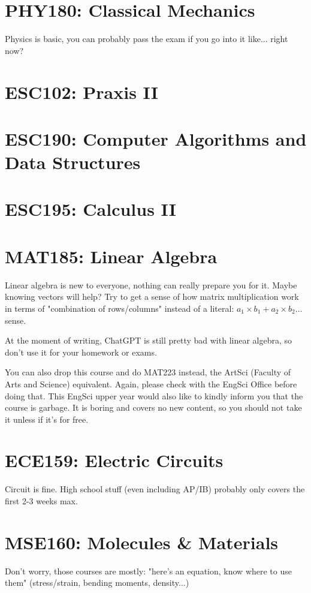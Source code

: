 \section{PHY180: Classical Mechanics}

Physics is basic, you can probably pass the exam if you go into it like... right now?

\section{ESC102: Praxis II}

\section{ESC190: Computer Algorithms and Data Structures}

\section{ESC195: Calculus II}

\section{MAT185: Linear Algebra}

Linear algebra is new to everyone, nothing can really prepare you for it. Maybe knowing vectors will help? Try to get a sense of how matrix multiplication work in terms of "combination of rows/columns" instead of a literal: $a_1\times b_1 + a_2\times b_2\dots$ sense.

At the moment of writing, ChatGPT is still pretty bad with linear algebra, so don't use it for your homework or exams.

You can also drop this course and do MAT223 instead, the ArtSci (Faculty of Arts and Science) equivalent. Again, please check with the EngSci Office before doing that. This EngSci upper year would also like to kindly inform you that the course is garbage. It is boring and covers no new content, so you should not take it unless if it's for free.

\section{ECE159: Electric Circuits}

Circuit is fine. High school stuff (even including AP/IB) probably only covers the first 2-3 weeks max.

\section{MSE160: Molecules \& Materials}

Don't worry, those courses are mostly: "here's an equation, know where to use them" (stress/strain, bending moments, density...)
